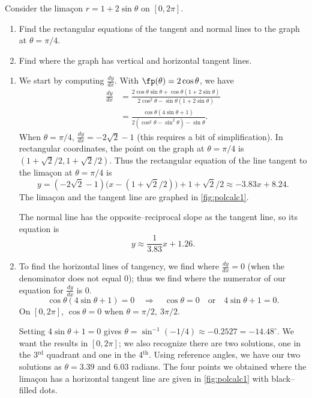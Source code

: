{Consider the lima\c con $r=1+2\sin\theta$ on $[0,2\pi]$.
\begin{enumerate}
	\item	Find the rectangular equations of the tangent and normal lines to the graph at $\theta=\pi/4$.
	\item	Find where the graph has vertical and horizontal tangent lines.
\end{enumerate}
}
{\begin{enumerate}
	\item We start by computing $\frac{dy}{dx}$. With $\fp(\theta) = 2\cos\theta$, we have
	\begin{align*}
	\frac{dy}{dx} &= \frac{2\cos\theta\sin\theta + \cos\theta(1+2\sin\theta)}{2\cos^2\theta-\sin\theta(1+2\sin\theta)}\\
	&= \frac{\cos\theta(4\sin\theta+1)}{2(\cos^2\theta-\sin^2\theta)-\sin\theta}.
	\end{align*}
	When $\theta=\pi/4$, $\frac{dy}{dx}=-2\sqrt{2}-1$ (this requires a bit of simplification). In rectangular coordinates, the point on the graph at $\theta=\pi/4$ is $(1+\sqrt{2}/2,1+\sqrt{2}/2)$. Thus the rectangular equation of the line tangent to the lima\c con at $\theta=\pi/4$ is 
	$$y=(-2\sqrt{2}-1)\big(x-(1+\sqrt{2}/2)\big)+1+\sqrt{2}/2 \approx  -3.83 x+8.24.$$ The lima\c con and the tangent line are graphed in \autoref{fig:polcalc1}. 
	
	The normal line has the opposite--reciprocal slope as the tangent line, so its equation is 
	$$y \approx \frac{1}{3.83}x+1.26.$$
	
	\item		To find the horizontal lines of tangency, we find where $\frac{dy}{dx}=0$ (when the denominator does not equal 0); thus we find where the numerator of our equation for $\frac{dy}{dx}$ is 0.
	$$\cos\theta(4\sin\theta+1)=0\quad \Rightarrow \quad \cos\theta=0 \quad \text{or}\quad 4\sin\theta+1=0.$$
	On $[0,2\pi]$, $\cos\theta=0$ when $\theta=\pi/2,\ 3\pi/2$. 

Setting $4\sin\theta+1=0$ gives $\theta=\sin^{-1}(-1/4)\approx -0.2527 = -14.48^\circ$. We want the results in $[0,2\pi]$; we also recognize there are two solutions, one in the 3$^\text{rd}$ quadrant and one in the 4$^\text{th}$. Using reference angles, we have our two solutions as $\theta =3.39$ and $6.03$ radians. The four points we obtained where the lima\c con has a horizontal tangent line are given in \autoref{fig:polcalc1} with black--filled dots.\bigskip


\end{enumerate}}
